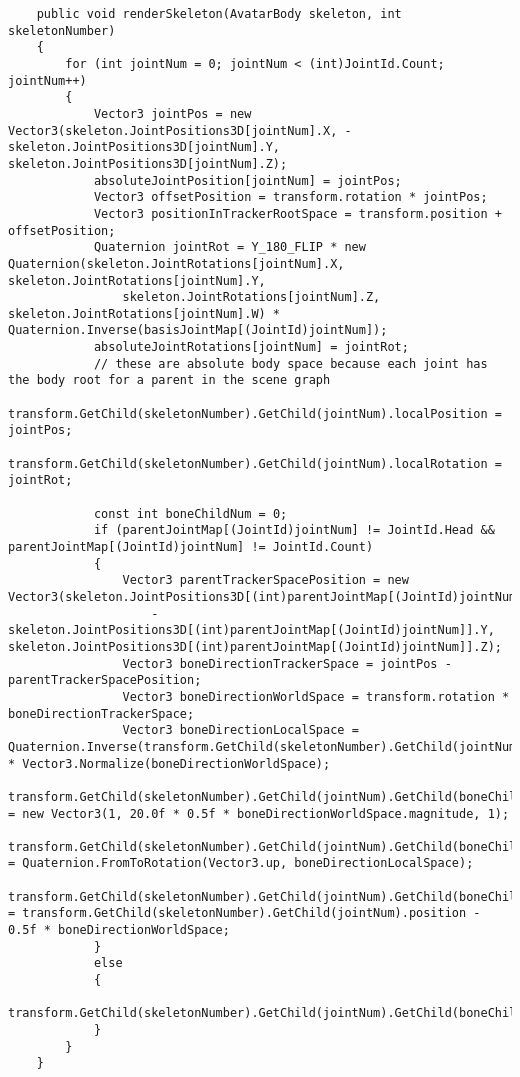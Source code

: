 \begin{verbatim}
    public void renderSkeleton(AvatarBody skeleton, int skeletonNumber)
    {
        for (int jointNum = 0; jointNum < (int)JointId.Count; jointNum++)
        {
            Vector3 jointPos = new Vector3(skeleton.JointPositions3D[jointNum].X, -skeleton.JointPositions3D[jointNum].Y, skeleton.JointPositions3D[jointNum].Z);
            absoluteJointPosition[jointNum] = jointPos;
            Vector3 offsetPosition = transform.rotation * jointPos;
            Vector3 positionInTrackerRootSpace = transform.position + offsetPosition;
            Quaternion jointRot = Y_180_FLIP * new Quaternion(skeleton.JointRotations[jointNum].X, skeleton.JointRotations[jointNum].Y,
                skeleton.JointRotations[jointNum].Z, skeleton.JointRotations[jointNum].W) * Quaternion.Inverse(basisJointMap[(JointId)jointNum]);
            absoluteJointRotations[jointNum] = jointRot;
            // these are absolute body space because each joint has the body root for a parent in the scene graph
            transform.GetChild(skeletonNumber).GetChild(jointNum).localPosition = jointPos;
            transform.GetChild(skeletonNumber).GetChild(jointNum).localRotation = jointRot;

            const int boneChildNum = 0;
            if (parentJointMap[(JointId)jointNum] != JointId.Head && parentJointMap[(JointId)jointNum] != JointId.Count)
            {
                Vector3 parentTrackerSpacePosition = new Vector3(skeleton.JointPositions3D[(int)parentJointMap[(JointId)jointNum]].X,
                    -skeleton.JointPositions3D[(int)parentJointMap[(JointId)jointNum]].Y, skeleton.JointPositions3D[(int)parentJointMap[(JointId)jointNum]].Z);
                Vector3 boneDirectionTrackerSpace = jointPos - parentTrackerSpacePosition;
                Vector3 boneDirectionWorldSpace = transform.rotation * boneDirectionTrackerSpace;
                Vector3 boneDirectionLocalSpace = Quaternion.Inverse(transform.GetChild(skeletonNumber).GetChild(jointNum).rotation) * Vector3.Normalize(boneDirectionWorldSpace);
                transform.GetChild(skeletonNumber).GetChild(jointNum).GetChild(boneChildNum).localScale = new Vector3(1, 20.0f * 0.5f * boneDirectionWorldSpace.magnitude, 1);
                transform.GetChild(skeletonNumber).GetChild(jointNum).GetChild(boneChildNum).localRotation = Quaternion.FromToRotation(Vector3.up, boneDirectionLocalSpace);
                transform.GetChild(skeletonNumber).GetChild(jointNum).GetChild(boneChildNum).position = transform.GetChild(skeletonNumber).GetChild(jointNum).position - 0.5f * boneDirectionWorldSpace;
            }
            else
            {
                transform.GetChild(skeletonNumber).GetChild(jointNum).GetChild(boneChildNum).gameObject.SetActive(false);
            }
        }
    }


\end{verbatim}
